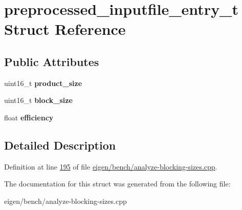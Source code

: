 \hypertarget{structpreprocessed__inputfile__entry__t}{}\section{preprocessed\+\_\+inputfile\+\_\+entry\+\_\+t Struct Reference}
\label{structpreprocessed__inputfile__entry__t}
\subsection*{Public Attributes}
\begin{DoxyCompactItemize}
\item 
\mbox{\label{structpreprocessed__inputfile__entry__t_a72f9893c60fa3abb327dab565c8b74ca}} 
uint16\+\_\+t {\bfseries product\+\_\+size}
\item 
\mbox{\label{structpreprocessed__inputfile__entry__t_a49b9603127ce9111aab91c236eb504d3}} 
uint16\+\_\+t {\bfseries block\+\_\+size}
\item 
\mbox{\label{structpreprocessed__inputfile__entry__t_a824c0c37cd74300a564106383b4b1d61}} 
float {\bfseries efficiency}
\end{DoxyCompactItemize}


\subsection{Detailed Description}


Definition at line \hyperlink{eigen_2bench_2analyze-blocking-sizes_8cpp_source_l00195}{195} of file \hyperlink{eigen_2bench_2analyze-blocking-sizes_8cpp_source}{eigen/bench/analyze-\/blocking-\/sizes.\+cpp}.



The documentation for this struct was generated from the following file\+:\begin{DoxyCompactItemize}
\item 
eigen/bench/analyze-\/blocking-\/sizes.\+cpp\end{DoxyCompactItemize}
